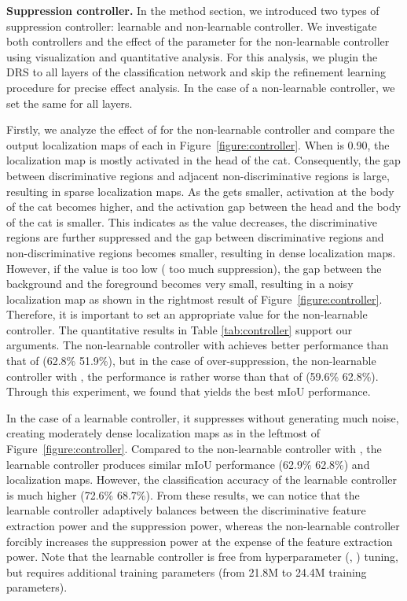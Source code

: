 \documentclass[letterpaper]{article} \usepackage{aaai21}  \usepackage{times}  \usepackage{helvet} \usepackage{courier}  \usepackage[hyphens]{url}  \usepackage{graphicx} \urlstyle{rm} \def\UrlFont{\rm}  \usepackage{natbib}  \usepackage{caption} \frenchspacing  \setlength{\pdfpagewidth}{8.5in}  \setlength{\pdfpageheight}{11in}
\begin{document}
\noindent\textbf{Suppression controller.} 
In the method section, we introduced two types of suppression controller: learnable and non-learnable controller.
We investigate both controllers and the effect of the parameter  for the non-learnable controller using visualization and quantitative analysis. For this analysis, we plugin the DRS to all layers of the classification network and skip the refinement learning procedure for precise effect analysis.
In the case of a non-learnable controller, we set the same  for all layers.

Firstly, we analyze the effect of  for the non-learnable controller and compare the output localization maps of each  in Figure~\ref{figure:controller}.
When  is 0.90, the localization map is mostly activated in the head of the cat.
Consequently, the gap between discriminative regions and adjacent non-discriminative regions is large, resulting in sparse localization maps.
As the  gets smaller, activation at the body of the cat becomes higher, and the activation gap between the head and the body of the cat is smaller.
This indicates as the  value decreases, the discriminative regions are further suppressed and the gap between discriminative regions and non-discriminative regions becomes smaller, resulting in dense localization maps.
However, if the  value is too low ( too much suppression), the gap between the background and the foreground becomes very small, resulting in a noisy localization map as shown in the rightmost result of Figure~\ref{figure:controller}.
Therefore, it is important to set an appropriate  value for the non-learnable controller.
The quantitative results in Table \ref{tab:controller} support our arguments. 
The non-learnable controller with  achieves better performance than that of  (62.8\%  51.9\%), but in the case of over-suppression,  the non-learnable controller with , the performance is rather worse than that of  (59.6\%  62.8\%).
Through this experiment, we found that  yields the best mIoU performance.

In the case of a learnable controller, it suppresses without generating much noise, creating moderately dense localization maps as in the leftmost of Figure~\ref{figure:controller}.
Compared to the non-learnable controller with , the learnable controller produces similar mIoU performance (62.9\%  62.8\%) and localization maps.
However, the classification accuracy of the learnable controller is much higher (72.6\%  68.7\%).
From these results, we can notice that the learnable controller adaptively balances between the discriminative feature extraction power and the suppression power, whereas the non-learnable controller forcibly increases the suppression power at the expense of the feature extraction power.
Note that the learnable controller is free from hyperparameter (, ) tuning, but requires additional training parameters (from 21.8M to 24.4M training parameters).
\end{document}
